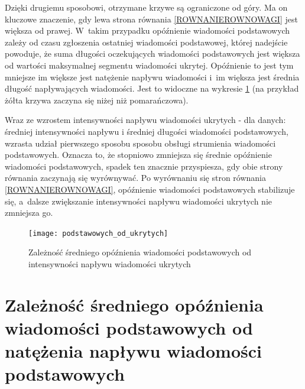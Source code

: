 \documentclass[a4paper, twoside, 12pt]{report}
\begin{document}
            Dzięki drugiemu sposobowi, otrzymane krzywe są ograniczone od góry.
            Ma on kluczowe znaczenie, gdy lewa strona równania \ref{ROWNANIEROWNOWAGI} jest większa od prawej.
            W~takim przypadku
            opóźnienie wiadomości podstawowych zależy od czasu zgłoszenia ostatniej
            wiadomości podstawowej, której nadejście powoduje, że suma długości oczekujących
            wiadomości podstawowych jest większa od wartości maksymalnej segmentu wiadomości ukrytej.
            Opóźnienie to jest tym mniejsze im większe jest natężenie napływu wiadomości
            i~im większa jest średnia długość napływających wiadomości. Jest to widoczne na wykresie
            \ref{OPOZNIENIEPODSTAWOWYCHODUKRYTYCH} (na przykład żółta krzywa zaczyna
            się niżej niż pomarańczowa).

            Wraz ze wzrostem intensywności napływu wiadomości ukrytych - dla danych:
            średniej intensywności napływu i średniej długości wiadomości podstawowych, wzrasta udział
            pierwszego sposobu sposobu obsługi strumienia wiadomości podstawowych.
            Oznacza to, że stopniowo zmniejsza się średnie opóźnienie wiadomości podstawowych,
            spadek ten znacznie przyspiesza, gdy obie strony równania zaczynają się wyrównywać.
            Po wyrównaniu się stron równania \ref{ROWNANIEROWNOWAGI},
            opóźnienie wiadomości podstawowych stabilizuje się, a~dalsze zwiększanie
            intensywności napływu wiadomości ukrytych nie zmniejsza go.

        \begin{figure}[h]
                \centering
                \texttt{[image: podstawowych\_od\_ukrytych]}
                \caption{Zależność średniego opóźnienia wiadomości podstawowych od
                    intensywności napływu wiadomości ukrytych}
                \label{OPOZNIENIEPODSTAWOWYCHODUKRYTYCH}
        \end{figure}



    \section{Zależność średniego opóźnienia wiadomości podstawowych od natężenia napływu wiadomości podstawowych} \label{BADANIEDLUGOSCISEGMENTUDANYCHUKRYTYCH}
\end{document}
